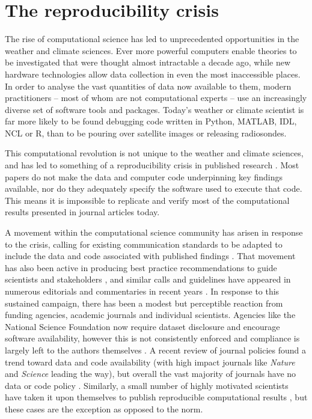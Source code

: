 \section{The reproducibility crisis}
The rise of computational science has led to unprecedented opportunities in the weather and climate sciences. Ever more powerful computers enable theories to be investigated that were thought almost intractable a decade ago, while new hardware technologies allow data collection in even the most inaccessible places. In order to analyse the vast quantities of data now available to them, modern practitioners – most of whom are not computational experts – use an increasingly diverse set of software tools and packages. Today's weather or climate scientist is far more likely to be found debugging code written in Python, MATLAB, IDL, NCL or R, than to be pouring over satellite images or releasing radiosondes. 

This computational revolution is not unique to the weather and climate sciences, and has led to something of a reproducibility crisis in published research \citep[e.g.][]{Peng2011}. Most papers do not make the data and computer code underpinning key findings available, nor do they adequately specify the software used to execute that code. This means it is impossible to replicate and verify most of the computational results presented in journal articles today.

A movement within the computational science community has arisen in response to the crisis, calling for existing communication standards to be adapted to include the data and code associated with published findings \citep[e.g.][]{Stodden2014}. That movement has also been active in producing best practice recommendations to guide scientists and stakeholders \citep[e.g.][]{Prlic2012,Sandve2013,Stodden2012a,Stodden2014}, and similar calls and guidelines have appeared in numerous editorials and commentaries in recent years \citep[e.g.][]{Barnes2010,Ince2012,Merali2010}. In response to this sustained campaign, there has been a modest but perceptible reaction from funding agencies, academic journals and individual scientists. Agencies like the National Science Foundation now require dataset disclosure and encourage software availability, however this is not consistently enforced and compliance is largely left to the authors themselves \citep{Stodden2013}. A recent review of journal policies found a trend toward data and code availability (with high impact journals like \textit{Nature} and \textit{Science} leading the way), but overall the vast majority of journals have no data or code policy \citep{Stodden2013}. Similarly, a small number of highly motivated scientists have taken it upon themselves to publish reproducible computational results \citep[e.g.][]{Crooks2014,Ketcheson2012,Schmitt2015}, but these cases are the exception as opposed to the norm.

